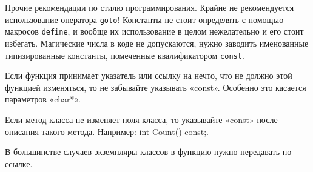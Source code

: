 \documentclass{article}
\begin{document}
\vskip0.5cm
\Large Прочие рекомендации по стилю программирования.
\normalsize
\vskip0.5cm
Крайне не рекомендуется использование оператора \texttt{goto}! Константы не стоит определять с помощью макросов \texttt{define}, и вообще их использование в целом нежелательно и его стоит избегать. Магические числа в коде не допускаются, нужно заводить именованные типизированные константы, помеченные квалификатором \texttt{const}.

Если функция принимает указатель или ссылку на нечто, что не должно этой функцией изменяться, то не забывайте указывать «const». Особенно это касается параметров «char*». 

Если метод класса не изменяет поля класса, то указывайте «const» после описания такого метода. Например: int Count() const;. 

В большинстве случаев экземпляры классов в функцию нужно передавать по ссылке.  
\end{document}
